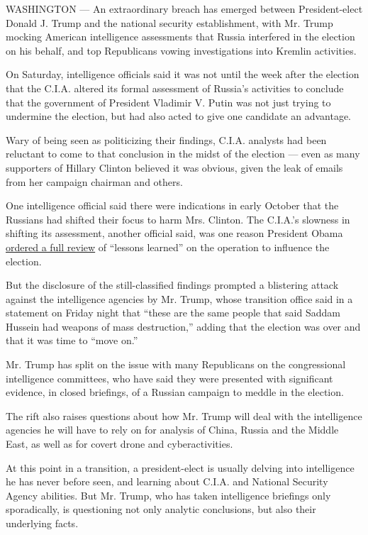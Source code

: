 WASHINGTON --- An extraordinary breach has emerged between
President-elect Donald J. Trump and the national security establishment,
with Mr. Trump mocking American intelligence assessments that Russia
interfered in the election on his behalf, and top Republicans vowing
investigations into Kremlin activities.

On Saturday, intelligence officials said it was not until the week after
the election that the C.I.A. altered its formal assessment of Russia's
activities to conclude that the government of President Vladimir V.
Putin was not just trying to undermine the election, but had also acted
to give one candidate an advantage.

Wary of being seen as politicizing their findings, C.I.A. analysts had
been reluctant to come to that conclusion in the midst of the election
--- even as many supporters of Hillary Clinton believed it was obvious,
given the leak of emails from her campaign chairman and others.

One intelligence official said there were indications in early October
that the Russians had shifted their focus to harm Mrs. Clinton. The
C.I.A.'s slowness in shifting its assessment, another official said, was
one reason President Obama
\href{https://www.nytimes.com/2016/12/09/us/obama-russia-election-hack.html}{ordered
a full review} of ``lessons learned'' on the operation to influence the
election.

But the disclosure of the still-classified findings prompted a
blistering attack against the intelligence agencies by Mr. Trump, whose
transition office said in a statement on Friday night that ``these are
the same people that said Saddam Hussein had weapons of mass
destruction,'' adding that the election was over and that it was time to
``move on.''

Mr. Trump has split on the issue with many Republicans on the
congressional intelligence committees, who have said they were presented
with significant evidence, in closed briefings, of a Russian campaign to
meddle in the election.

The rift also raises questions about how Mr. Trump will deal with the
intelligence agencies he will have to rely on for analysis of China,
Russia and the Middle East, as well as for covert drone and
cyberactivities.

At this point in a transition, a president-elect is usually delving into
intelligence he has never before seen, and learning about C.I.A. and
National Security Agency abilities. But Mr. Trump, who has taken
intelligence briefings only sporadically, is questioning not only
analytic conclusions, but also their underlying facts.

